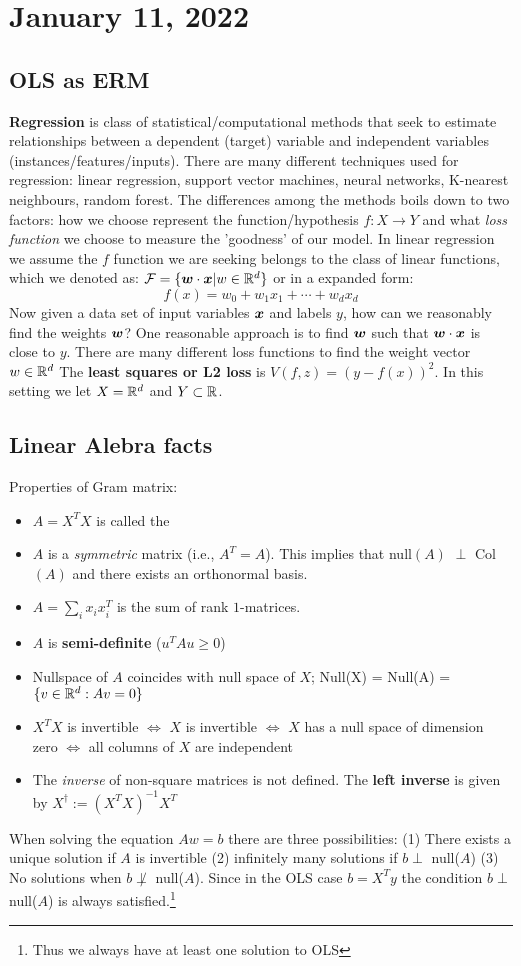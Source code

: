 \section{January 11, 2022}
\subsection{OLS as ERM}
\textbf{Regression} is class of statistical/computational methods that seek to estimate relationships between a dependent (target) variable and independent variables (instances/features/inputs).
There are many different techniques used for regression: linear regression, support vector machines, neural networks, K-nearest neighbours, random forest.
The differences among the methods boils down to two factors: how we choose represent the function/hypothesis $f: X \to Y$ and what \textit{loss function} we choose to measure the 'goodness' of our model. 
In linear regression we assume the $f$ function we are seeking belongs to the class of linear functions, which we denoted as:  $\mathcal F = \{\boldsymbol{w} \cdot \boldsymbol{x} | w \in \mathbb R^d \}$ or in a expanded form:
$$
f(x) = w_0 + w_1 x_1 + \cdots + w_d x_d
$$
Now given a data set of input variables $\boldsymbol{x}$ and labels $y$, how can we reasonably find the weights $\boldsymbol{w}$? One reasonable approach is to find $\boldsymbol{w}$ such that $\boldsymbol{w} \cdot \boldsymbol{x}$ is close to $y$.
There are many different loss functions to find the weight vector $w \in \mathbb R^d$
The \textbf{least squares or L2 loss} is $V(f,z) = (y - f(x))^2$. In this setting  we let $X = \mathbb R^d$ and $Y \subset \mathbb R$. 
\subsection{Linear Alebra facts}
Properties of Gram matrix:
\begin{itemize}
    \item $A = X^T X$ is called the 
    \item $A$ is a \textit{symmetric} matrix (i.e., $A^T = A$). This implies that null$(A)$ $\perp$ Col$(A)$ and there exists an orthonormal basis.
    \item $A = \sum_{i}x_ix_{i}^T$ is the sum of rank $1$-matrices.
    \item $A$ is \textbf{semi-definite} ($u^TAu \geq 0$)
    \item Nullspace of $A$ coincides with null space of $X$; Null(X) = Null(A) = $\{v \in \mathbb R^d : Av =0\}$
    \item $X^T X$ is invertible $\iff$ $X$ is invertible $\iff$ $X$ has a null space of dimension zero $\iff$ all columns of $X$ are independent
    \item The \textit{inverse} of non-square matrices is not defined. The \textbf{left inverse} is given by $X^{\dag} := (X^TX)^{-1}X^T $
\end{itemize}
When solving the equation $Aw =b$ there are three possibilities: (1) There exists a unique solution if $A$ is invertible (2) infinitely many solutions if $b \perp$ null($A$) (3) No solutions when $b \not\perp$ null($A$). Since in the OLS case $b = X^Ty$ the condition $b \perp$ null($A$) is always satisfied.\footnote{Thus we always have at least one solution to OLS}
